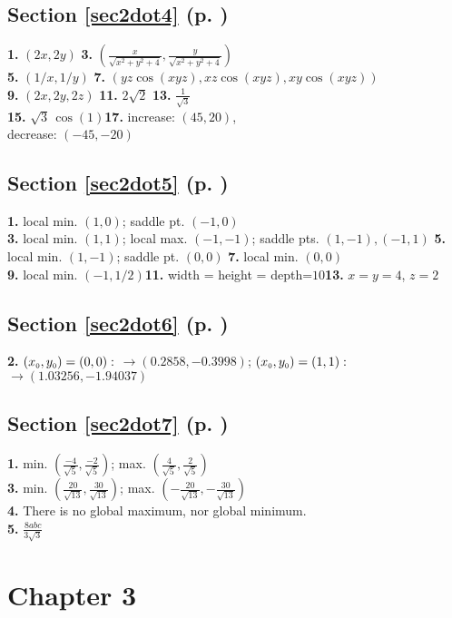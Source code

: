 \begin{multicols}{2}
\subsection*{Section \ref{sec2dot4} (p. \pageref{sec2dot4})}
\textbf{1.} $(2x,2y)$\quad
\textbf{3.} $(\frac{x}{\sqrt{x^2 + y^2 + 4}},\frac{y}{\sqrt{x^2 + y^2 + 4}})$\\
\textbf{5.} $(1/x,1/y)$\quad
\textbf{7.} $(yz\cos(xyz),xz\cos(xyz),xy\cos(xyz))$\\
\textbf{9.} $(2x,2y,2z)$\quad
\textbf{11.} $2\sqrt{2}$\quad
\textbf{13.} $\frac{1}{\sqrt{3}}$\\
\textbf{15.} $\sqrt{3}\,\cos(1)$\quad\textbf{17.} increase: $(45,20)$,\\decrease: $(-45,-20)$
\subsection*{Section \ref{sec2dot5} (p. \pageref{sec2dot5})}
\textbf{1.} local min. $(1,0)$; saddle pt. $(-1,0)$\\\textbf{3.}
local min. $(1,1)$; local max. $(-1,-1)$; saddle pts. $(1,-1),(-1,1)$\quad
\textbf{5.} local min. $(1,-1)$; saddle pt. $(0,0)$\quad
\textbf{7.} local min. $(0,0)$\\\textbf{9.} local min. $(-1,1/2)$\quad\textbf{11.}
width = height = depth=$10$\quad\textbf{13.} $x=y=4$, $z=2$
\subsection*{Section \ref{sec2dot6} (p. \pageref{sec2dot6})}
\textbf{2.} $(x_{\scriptscriptstyle 0},y_{\scriptscriptstyle 0})=(0,0):$ $\rightarrow (0.2858,-0.3998)$;
$(x_{\scriptscriptstyle 0},y_{\scriptscriptstyle 0})=(1,1):$ $\rightarrow (1.03256,-1.94037)$
\subsection*{Section \ref{sec2dot7} (p. \pageref{sec2dot7})}
\textbf{1.} min. $\left(\frac{-4}{\sqrt{5}},\frac{-2}{\sqrt{5}}\right)$;
max. $\left(\frac{4}{\sqrt{5}},\frac{2}{\sqrt{5}}\right)$
\\
\textbf{3.}
min. $\left(\frac{20}{\sqrt{13}},\frac{30}{\sqrt{13}}\right)$;
max. $\left(-\frac{20}{\sqrt{13}},-\frac{30}{\sqrt{13}}\right)$
\\
\textbf{4.} There is no global maximum, nor global minimum.
\\
\textbf{5.} $\frac{8abc}{3\sqrt{3}}$
\section*{Chapter 3}

\end{multicols}
